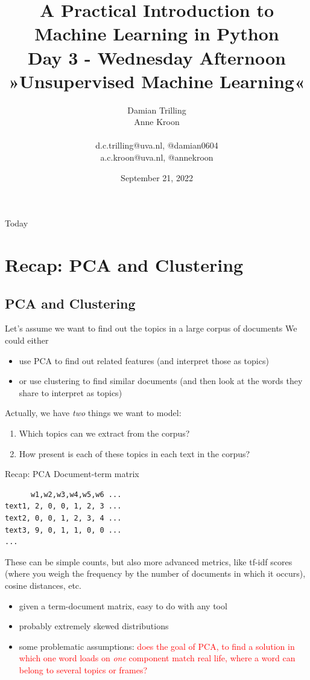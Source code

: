 \documentclass[compress]{beamer}
\title[Big Data and Automated Content Analysis]{\textbf{A Practical Introduction to Machine Learning in Python} \\Day 3 - Wednesday Afternoon \\ »Unsupervised Machine Learning«}
\author[Damian Trilling, Anne Kroon]{Damian Trilling \\ Anne Kroon \\ ~ \\ \footnotesize{d.c.trilling@uva.nl, @damian0604 \\a.c.kroon@uva.nl, @annekroon} \\}
\date{September 21, 2022}
\institute[Gesis]{Gesis}
\begin{document}
	
	\begin{frame}{}
		\titlepage
	\end{frame}
	
	\begin{frame}{Today}
		\tableofcontents
	\end{frame}
	


\section[Recap]{Recap: PCA and Clustering}

\subsection*{PCA and Clustering}


\begin{frame}{Let's assume we want to find out the topics in a large corpus of documents}
We could either
\begin{itemize}
	\item use PCA to find out related features (and interpret those as topics)
	\item or use clustering to find similar documents (and then look at the words they share to interpret as topics)
\end{itemize}

\pause

Actually, we have \emph{two} things we want to model:

\begin{enumerate}
	\item Which topics can we extract from the corpus?
	\item How present is each of these topics in each text in the corpus?
\end{enumerate}

\end{frame}


\begin{frame}[fragile]{Recap: PCA}
Document-term matrix
\begin{lstlisting}
      w1,w2,w3,w4,w5,w6 ...
text1, 2, 0, 0, 1, 2, 3 ...
text2, 0, 0, 1, 2, 3, 4 ...
text3, 9, 0, 1, 1, 0, 0 ...
...
\end{lstlisting}
{\small{These can be simple counts, but also more advanced metrics, like tf-idf scores (where you weigh the frequency by the number of documents in which it occurs), cosine distances, etc.}}
\pause
	\begin{itemize}
	\item given a term-document matrix, easy to do with any tool
	\item probably extremely skewed distributions
	\item some problematic assumptions: \textcolor{red}{does the goal of PCA, to find a solution in which one word loads on \emph{one} component match real life, where a word can belong to several topics or frames?}
\end{itemize}

\end{frame}
\end{document}
